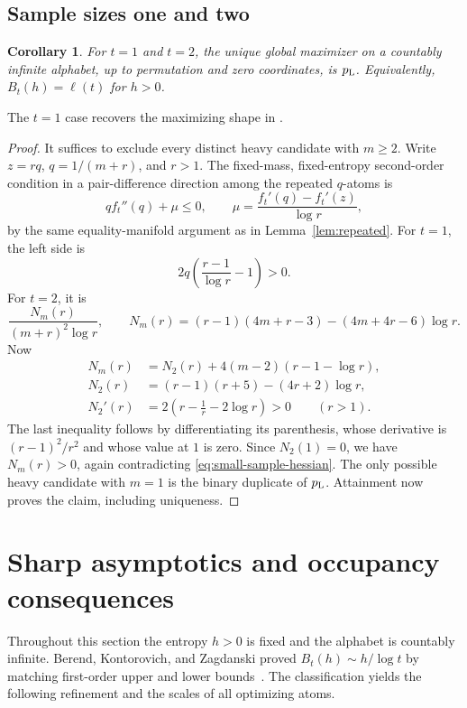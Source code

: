 \documentclass[11pt]{article}
\numberwithin{equation}{section}
\newtheorem{corollary}[theorem]{Corollary}
\begin{document}
\subsection{Sample sizes one and two}
\begin{corollary}\label{cor:small-samples}
For $t=1$ and $t=2$, the unique global maximizer on a countably infinite
alphabet, up to permutation and zero coordinates, is $p_{\rm L}$.
Equivalently, $B_t(h)=\ell(t)$ for $h>0$.
\end{corollary}
The $t=1$ case recovers the maximizing shape in
\cite[Proposition~3]{BKZ}.
\begin{proof}
It suffices to exclude every distinct heavy candidate with $m\ge2$.
Write $z=rq$, $q=1/(m+r)$, and $r>1$. The fixed-mass, fixed-entropy
second-order condition in a pair-difference direction among the repeated
$q$-atoms is
\begin{equation}\label{eq:small-sample-hessian}
 qf_t''(q)+\mu\le0,\qquad
 \mu=\frac{f_t'(q)-f_t'(z)}{\log r},
\end{equation}
by the same equality-manifold argument as in Lemma~\ref{lem:repeated}.
For $t=1$, the left side is
\[
 2q\left(\frac{r-1}{\log r}-1\right)>0.
\]
For $t=2$, it is
\[
 \frac{N_m(r)}{(m+r)^2\log r},\qquad
 N_m(r)=(r-1)(4m+r-3)-(4m+4r-6)\log r.
\]
Now
\[
 \begin{aligned}
 N_m(r)&=N_2(r)+4(m-2)(r-1-\log r),\\
 N_2(r)&=(r-1)(r+5)-(4r+2)\log r,\\
 N_2'(r)&=2\left(r-\frac1r-2\log r\right)>0\qquad(r>1).
 \end{aligned}
\]
The last inequality follows by differentiating its parenthesis, whose
derivative is $(r-1)^2/r^2$ and whose value at $1$ is zero. Since
$N_2(1)=0$, we have $N_m(r)>0$, again contradicting
\eqref{eq:small-sample-hessian}. The only possible heavy candidate with
$m=1$ is the binary duplicate of $p_{\rm L}$. Attainment now proves the
claim, including uniqueness.
\end{proof}

\section{Sharp asymptotics and occupancy consequences}\label{sec:asymptotics}
Throughout this section the entropy $h>0$ is fixed and the alphabet is
countably infinite. Berend, Kontorovich, and Zagdanski proved
$B_t(h)\sim h/\log t$ by matching first-order upper and lower
bounds~\cite[Theorems~3--4]{BKZ}. The classification yields the following
refinement and the scales of all optimizing atoms.
\end{document}
